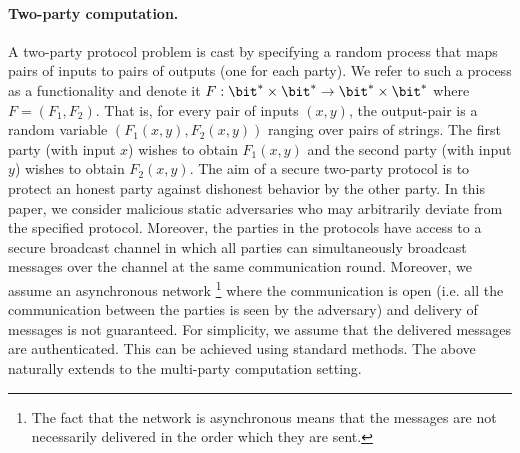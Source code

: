   \paragraph{Two-party computation.}
  A two-party protocol problem is cast by specifying a random process
  that maps pairs of inputs to pairs of outputs (one for each party). We
  refer to such a process as a functionality and denote it $F : \bit^*
  \times \bit^*\rightarrow\bit^* \times \bit^*$ where $F = (F_1,
  F_2)$. That is, for every pair of inputs $(x, y)$, the output-pair is
  a random variable $(F_1(x, y), F_2(x, y))$ ranging over pairs of
  strings. The first party (with input $x$) wishes to obtain $F_1(x, y)$
  and the second party (with input $y$) wishes to obtain $F_2(x,
  y)$. The aim of a secure two-party protocol is to protect an honest
  party against dishonest behavior by the other party. In this paper, we
  consider malicious static adversaries who may arbitrarily deviate from
  the specified protocol. Moreover, the parties in the protocols have
  access to a secure broadcast channel in which all parties can
  simultaneously broadcast messages over the channel at the same
  communication round. Moreover, we assume an asynchronous
  network%
  \footnote{The fact that the network is asynchronous means that
    the messages are not necessarily delivered in the order which they
    are sent.}
  where the communication is open (i.e. all the
  communication between the parties is seen by the adversary) and
  delivery of messages is not guaranteed. For simplicity, we assume that
  the delivered messages are authenticated. This can be achieved using
  standard methods. The above naturally extends to the multi-party
  computation setting. 

